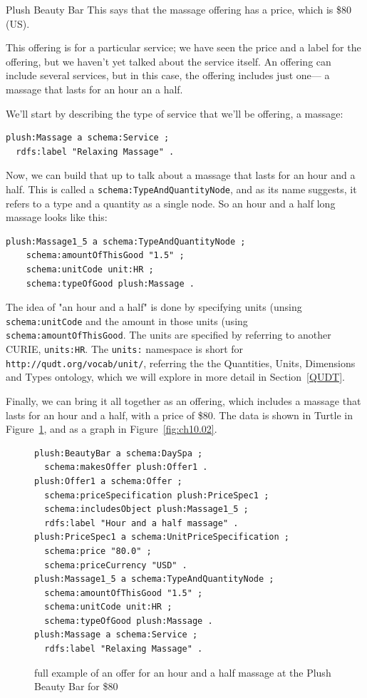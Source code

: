 \begin{example}{Plush Beauty Bar}
This says that the massage offering has a price, which is \$80 (US).

This offering is for a particular service; we have seen the price and 
a label for the offering, 
but we haven't yet talked about the service itself.  An
offering can include several services, but in this case, the offering
includes just one--- a massage that lasts for an hour an a half.  

We'll start by describing the type of service that we'll be offering, a massage:


\begin{lstlisting}
plush:Massage a schema:Service ;
  rdfs:label "Relaxing Massage" .
\end{lstlisting}

Now, we can build that up to talk about a massage that lasts for an hour
and a half.  This is called a \texttt{schema:TypeAndQuantityNode}, and as its 
name suggests, it refers to a type and a quantity as a single node.  
So an hour and a half long  massage looks like this:

\begin{lstlisting}
plush:Massage1_5 a schema:TypeAndQuantityNode ;
    schema:amountOfThisGood "1.5" ;
    schema:unitCode unit:HR ;  
    schema:typeOfGood plush:Massage .
\end{lstlisting}

The idea of "an hour and a half" is done by specifying units (unsing \texttt{schema:unitCode} and the amount in those units (using \texttt{schema:amountOfThisGood}.  The units are specified by referring 
to another CURIE, \texttt{units:HR}.  The \texttt{units:} namespace
is short for \texttt{http://qudt.org/vocab/unit/}, referring the the Quantities, Units, Dimensions and Types ontology, which we will explore in more detail in 
Section~\ref{QUDT}. 

Finally, we can bring it all together as an offering, which includes a massage
that lasts for an hour and a half, with a price of \$80.  The data is shown in 
Turtle in Figure~\ref{fig:ch10.plushdata}, and as a graph in Figure~\ref{fig:ch10.02}.

\begin{figure}
\begin{lstlisting}
plush:BeautyBar a schema:DaySpa ;
  schema:makesOffer plush:Offer1 .
plush:Offer1 a schema:Offer ;
  schema:priceSpecification plush:PriceSpec1 ;
  schema:includesObject plush:Massage1_5 ;
  rdfs:label "Hour and a half massage" .
plush:PriceSpec1 a schema:UnitPriceSpecification ;
  schema:price "80.0" ;
  schema:priceCurrency "USD" .
plush:Massage1_5 a schema:TypeAndQuantityNode ;
  schema:amountOfThisGood "1.5" ;
  schema:unitCode unit:HR ;  
  schema:typeOfGood plush:Massage .
plush:Massage a schema:Service ;
  rdfs:label "Relaxing Massage" .
\end{lstlisting}
    \caption{full example of an offer for an hour and a half massage at the Plush Beauty Bar for \$80}
    \label{fig:ch10.plushdata}
\end{figure}


\end{example}
